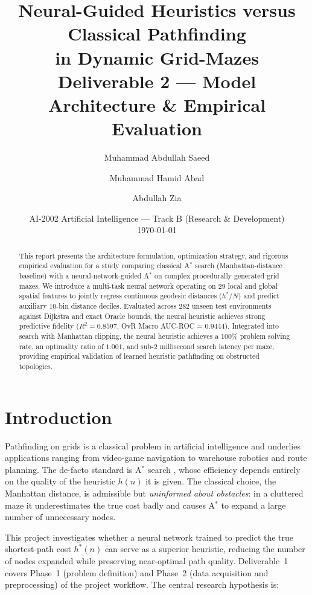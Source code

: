 \documentclass[11pt]{article}
\title{\textbf{Neural-Guided Heuristics versus Classical Pathfinding\\ in Dynamic Grid-Mazes}\\[4pt]
\large Deliverable 2 --- Model Architecture \& Empirical Evaluation}
\author{
  Muhammad Abdullah Saeed \and
  Muhammad Hamid Abad \and
  Abdullah Zia
}
\date{AI-2002 Artificial Intelligence --- Track B (Research \& Development)\\ \today}
\begin{document}
\maketitle

\begin{abstract}
\noindent
This report presents the architecture formulation, optimization strategy, and rigorous
empirical evaluation for a study comparing classical A$^\ast$ search (Manhattan-distance baseline)
with a neural-network-guided A$^\ast$ on complex procedurally generated grid mazes.
We introduce a multi-task neural network operating on 29 local and global spatial features
to jointly regress continuous geodesic distances ($h^\ast/N$) and predict auxiliary 10-bin distance
deciles. Evaluated across 282 unseen test environments against Dijkstra and exact Oracle bounds,
the neural heuristic achieves strong predictive fidelity ($R^2 = 0.8597$, OvR Macro AUC-ROC = $0.9444$).
Integrated into search with Manhattan clipping, the neural heuristic achieves a 100\% problem
solving rate, an optimality ratio of $1.001$, and sub-2 millisecond search latency per maze,
providing empirical validation of learned heuristic pathfinding on obstructed topologies.
\end{abstract}

\section{Introduction}
Pathfinding on grids is a classical problem in artificial intelligence and underlies
applications ranging from video-game navigation to warehouse robotics and route
planning. The de-facto standard is A$^\ast$ search \cite{hart1968}, whose efficiency
depends entirely on the quality of the heuristic $h(n)$ it is given. The classical
choice, the Manhattan distance, is admissible but \emph{uninformed about obstacles}:
in a cluttered maze it underestimates the true cost badly and causes A$^\ast$ to expand
a large number of unnecessary nodes.

This project investigates whether a neural network trained to predict the true
shortest-path cost $h^\ast(n)$ can serve as a superior heuristic, reducing the number of
nodes expanded while preserving near-optimal path quality. Deliverable~1 covers
Phase~1 (problem definition) and Phase~2 (data acquisition and preprocessing) of the
project workflow. The central research hypothesis is:
\end{document}
